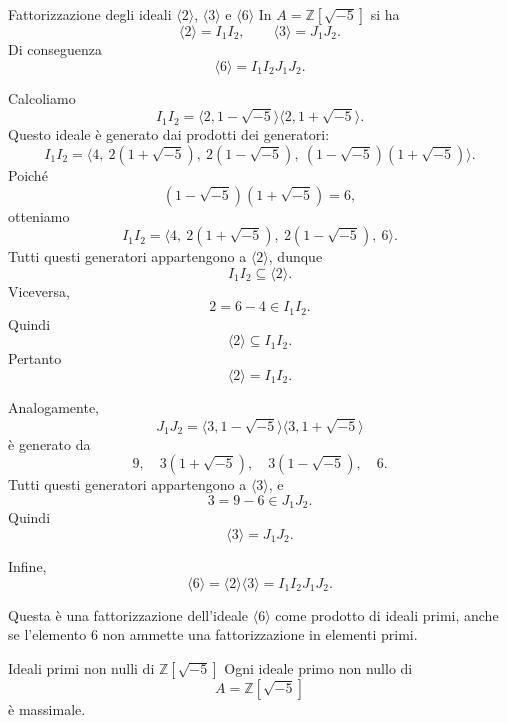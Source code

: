 \documentclass[a4paper]{article}
\begin{document}
\begin{radioactive}
\begin{snippetproposition}{Fattorizzazione degli ideali \(\langle 2 \rangle\), \(\langle 3 \rangle\) e \(\langle 6 \rangle\)}
    In \(A=\mathbb{Z}[\sqrt{-5}]\) si ha
    \[
        \langle 2 \rangle=I_1I_2,
        \qquad
        \langle 3 \rangle=J_1J_2.
    \]
    Di conseguenza
    \[
        \langle 6 \rangle=I_1I_2J_1J_2.
    \]
\end{snippetproposition}
\end{radioactive}

\begin{radioactive}
\begin{snippetproof}{}
    Calcoliamo
    \[
        I_1I_2
        =
        \langle 2,1-\sqrt{-5} \rangle\langle 2,1+\sqrt{-5} \rangle.
    \]
    Questo ideale è generato dai prodotti dei generatori:
    \[
        I_1I_2
        =
        \langle 4,\ 2(1+\sqrt{-5}),\ 2(1-\sqrt{-5}),\ (1-\sqrt{-5})(1+\sqrt{-5}) \rangle.
    \]
    Poiché
    \[
        (1-\sqrt{-5})(1+\sqrt{-5})=6,
    \]
    otteniamo
    \[
        I_1I_2=\langle 4,\ 2(1+\sqrt{-5}),\ 2(1-\sqrt{-5}),\ 6 \rangle.
    \]
    Tutti questi generatori appartengono a \(\langle 2 \rangle\), dunque
    \[
        I_1I_2\subseteq \langle 2 \rangle.
    \]
    Viceversa,
    \[
        2=6-4\in I_1I_2.
    \]
    Quindi
    \[
        \langle 2 \rangle\subseteq I_1I_2.
    \]
    Pertanto
    \[
        \langle 2 \rangle=I_1I_2.
    \]

    Analogamente,
    \[
        J_1J_2
        =
        \langle 3,1-\sqrt{-5} \rangle\langle 3,1+\sqrt{-5} \rangle
    \]
    è generato da
    \[
        9,\quad 3(1+\sqrt{-5}),\quad 3(1-\sqrt{-5}),\quad 6.
    \]
    Tutti questi generatori appartengono a \(\langle 3 \rangle\), e
    \[
        3=9-6\in J_1J_2.
    \]
    Quindi
    \[
        \langle 3 \rangle=J_1J_2.
    \]

    Infine,
    \[
        \langle 6 \rangle=\langle 2 \rangle\langle 3 \rangle=I_1I_2J_1J_2.
    \]
\end{snippetproof}
\end{radioactive}

\begin{radioactive}
Questa è una fattorizzazione dell'ideale \(\langle 6 \rangle\) come prodotto di ideali primi, anche se l'elemento \(6\) non ammette una fattorizzazione in elementi primi.
\end{radioactive}

\begin{radioactive}
\begin{snippetproposition}{Ideali primi non nulli di \(\mathbb{Z}[\sqrt{-5}]\)}
    Ogni ideale primo non nullo di
    \[
        A=\mathbb{Z}[\sqrt{-5}]
    \]
    è massimale.
\end{snippetproposition}
\end{radioactive}
\end{document}

